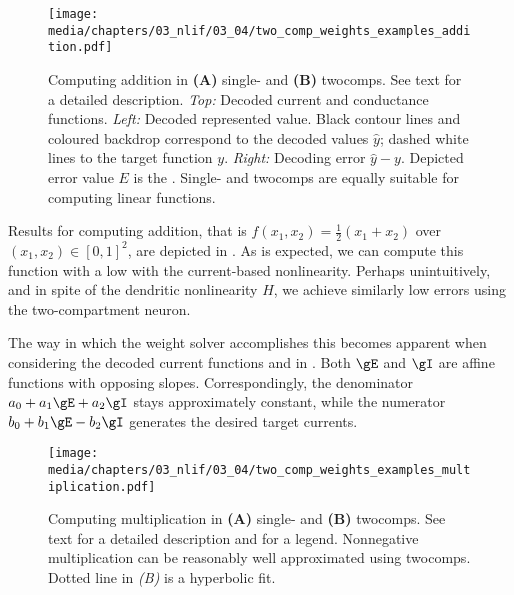 \begin{figure}
	\centering
	\texttt{[image: media/chapters/03\_nlif/03\_04/two\_comp\_weights\_examples\_addition.pdf]}%
	{\label{fig:two_comp_weights_examples_addition_a}}%
	{\label{fig:two_comp_weights_examples_addition_b}}%
	\caption[Computing addition in single- and \glspl{twocomp}]{Computing addition in \textbf{(A)} single- and \textbf{(B)} \glspl{twocomp}. See text for a detailed description. \emph{Top:} Decoded current and conductance functions. \emph{Left:} Decoded represented value. Black contour lines and coloured backdrop correspond to the decoded values $\hat y$; dashed white lines to the target function $y$. \emph{Right:} Decoding error $\hat y - y$. Depicted error value $E$ is the \NRMSE.
	Single- and \glspl{twocomp} are equally suitable for computing linear functions.
	}
	\label{fig:two_comp_weights_examples_addition}
\end{figure}

Results for computing addition, that is $f(x_1, x_2) = \frac{1}2 (x_1 + x_2)$ over $(x_1, x_2) \in [0, 1]^2$, are depicted in .
As is expected, we can compute this function with a low \NRMSE with the current-based nonlinearity.
Perhaps unintuitively, and in spite of the dendritic nonlinearity $H$, we achieve similarly low errors using the two-compartment \LIF neuron.

The way in which the weight solver accomplishes this becomes apparent when considering the decoded current functions \gE and \gI in .
Both $\gE$ and $\gI$ are affine functions with opposing slopes.
Correspondingly, the denominator $a_0 + a_1 \gE + a_2 \gI$ stays approximately constant, while the numerator $b_0 + b_1 \gE - b_2 \gI$ generates the desired target currents.


\begin{figure}
	\centering
	\texttt{[image: media/chapters/03\_nlif/03\_04/two\_comp\_weights\_examples\_multiplication.pdf]}%
	{\label{fig:two_comp_weights_examples_multiplication_a}}%
	{\label{fig:two_comp_weights_examples_multiplication_b}}%
	\caption[Computing multiplication in single- and \glspl{twocomp}]{Computing multiplication in \textbf{(A)} single- and \textbf{(B)} \glspl{twocomp}. See text for a detailed description and  for a legend. Nonnegative multiplication can be reasonably well approximated using \glspl{twocomp}. Dotted line in \emph{(B)} is a hyperbolic fit.
	}
	\label{fig:two_comp_weights_examples_multiplication}
\end{figure}

